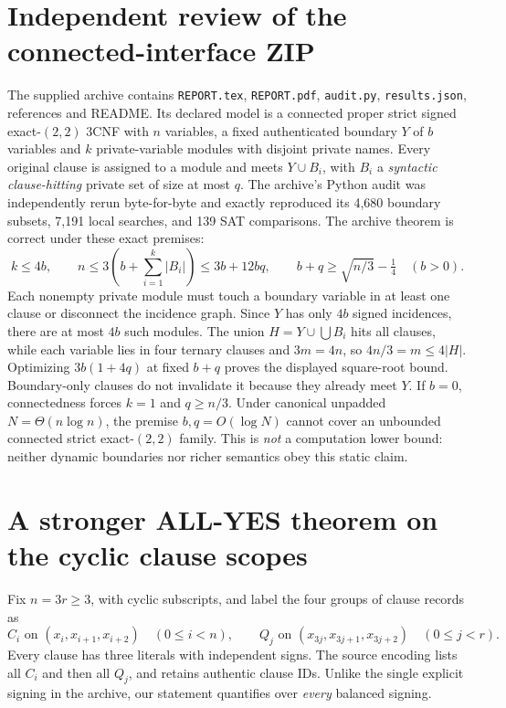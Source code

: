 \documentclass[11pt]{article}
\begin{document}
\section{Independent review of the connected-interface ZIP}
The supplied archive contains \texttt{REPORT.tex}, \texttt{REPORT.pdf}, \texttt{audit.py}, \texttt{results.json}, references and README. Its declared model is a connected proper strict signed exact-$(2,2)$ 3CNF with $n$ variables, a fixed authenticated boundary $Y$ of $b$ variables and $k$ private-variable modules with disjoint private names. Every original clause is assigned to a module and meets $Y\cup B_i$, with $B_i$ a \emph{syntactic clause-hitting} private set of size at most $q$. The archive's Python audit was independently rerun byte-for-byte and exactly reproduced its 4,680 boundary subsets, 7,191 local searches, and 139 SAT comparisons. The archive theorem is correct under these exact premises:
\begin{equation}
 k\le 4b,\qquad n\le3\left(b+\sum_{i=1}^k|B_i|\right)\le3b+12bq,
 \qquad b+q\ge\sqrt{n/3}-\tfrac14\quad(b>0).
 \label{eq:static}
\end{equation}
Each nonempty private module must touch a boundary variable in at least one clause or disconnect the incidence graph. Since $Y$ has only $4b$ signed incidences, there are at most $4b$ such modules. The union $H=Y\cup\bigcup B_i$ hits all clauses, while each variable lies in four ternary clauses and $3m=4n$, so $4n/3=m\le4|H|$. Optimizing $3b(1+4q)$ at fixed $b+q$ proves the displayed square-root bound. Boundary-only clauses do not invalidate it because they already meet $Y$. If $b=0$, connectedness forces $k=1$ and $q\ge n/3$. Under canonical unpadded $N=\Theta(n\log n)$, the premise $b,q=O(\log N)$ cannot cover an unbounded connected strict exact-$(2,2)$ family. This is \emph{not} a computation lower bound: neither dynamic boundaries nor richer semantics obey this static claim.

\section{A stronger ALL-YES theorem on the cyclic clause scopes}
Fix $n=3r\ge3$, with cyclic subscripts, and label the four groups of clause records as
\begin{equation}
 C_i\text{ on }(x_i,x_{i+1},x_{i+2})\quad(0\le i<n),
 \qquad Q_j\text{ on }(x_{3j},x_{3j+1},x_{3j+2})\quad(0\le j<r).
\end{equation}
Every clause has three literals with independent signs. The source encoding lists all $C_i$ and then all $Q_j$, and retains authentic clause IDs. Unlike the single explicit signing in the archive, our statement quantifies over \emph{every} balanced signing.
\end{document}
